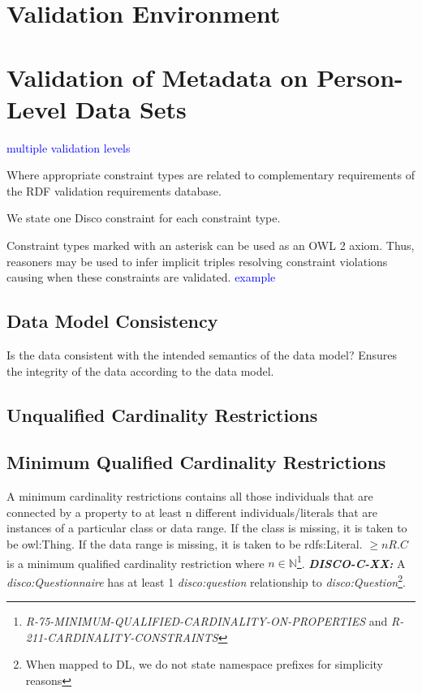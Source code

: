 \documentclass{elsart3p}    %
\begin{document}
\section{Validation Environment}

\section{Validation of Metadata on Person-Level Data Sets}

\textcolor{blue}{multiple validation levels}

Where appropriate constraint types are related to complementary requirements of the RDF validation requirements database.

We state one Disco constraint for each constraint type.

Constraint types marked with an asterisk can be used as an OWL 2 axiom.
Thus, reasoners may be used to infer implicit triples resolving constraint violations causing when these constraints are validated.
\textcolor{blue}{example}

\subsection{Data Model Consistency}

Is the data consistent with the intended semantics of the data model?
Ensures the integrity of the data according to the data model.

\subsection{Unqualified Cardinality Restrictions}

\subsection{Minimum Qualified Cardinality Restrictions}

A minimum cardinality restrictions contains all those individuals that are connected by a property to at least n different individuals/literals 
that are instances of a particular class or data range. If the class is missing, it is taken to be owl:Thing. 
If the data range is missing, it is taken to be rdfs:Literal.
$\geq n R. C$ is a minimum qualified cardinality restriction where $n \in \mathbb{N}$\footnote{{\em R-75-MINIMUM-QUALIFIED-CARDINALITY-ON-PROPERTIES} and {\em R-211-CARDINALITY-CONSTRAINTS}}.
\textbf{{\em DISCO-C-XX:}}
A {\em disco:Questionnaire} has at least 1 {\em disco:question} relationship to {\em disco:Question}\footnote{When mapped to DL, we do not state namespace prefixes for simplicity reasons}.
\end{document}
